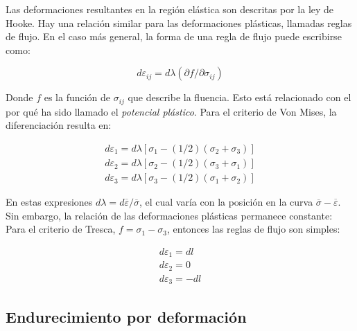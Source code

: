 Las deformaciones resultantes en la región elástica son descritas por la ley de Hooke. 
Hay una relación similar para las deformaciones plásticas, llamadas reglas de flujo. 
En el caso más general, la forma de una regla de flujo puede escribirse como: ~\cite{hosford2007}

\begin{equation}
d\varepsilon_{ij} = d\lambda (\partial f / \partial \sigma_{ij})
\end{equation}

Donde $f$ es la función de $\sigma_{ij}$ que describe la fluencia. Esto está relacionado 
con el por qué ha sido llamado el \textit{potencial plástico}. Para el criterio de 
Von Mises, la diferenciación resulta en: ~\cite{hosford2007}

\begin{align}
d\varepsilon_1 = d\lambda \left[ \sigma_1 - (1/2) (\sigma_2 + \sigma_3) \right] \\
d\varepsilon_2 = d\lambda \left[ \sigma_2 - (1/2) (\sigma_3 + \sigma_1) \right] \\
d\varepsilon_3 = d\lambda \left[ \sigma_3 - (1/2) (\sigma_1 + \sigma_2) \right]
\end{align}

En estas expresiones $d\lambda = d \overline{\varepsilon} / \overline{\sigma} $, el cual varía 
con la posición en la curva $ \overline{\sigma} - \overline{\varepsilon} $. Sin embargo, la 
relación de las deformaciones plásticas permanece constante: ~\cite{hosford2007} \\


Para el criterio de Tresca, $f = \sigma_1 - \sigma_3$, entonces las reglas de flujo son simples:
~\cite{hosford2007}

\begin{align*}
d\varepsilon_1 = dl \\
d\varepsilon_2 = 0 \\
d\varepsilon_3 = -dl
\end{align*}


\subsection{Endurecimiento por deformación}

